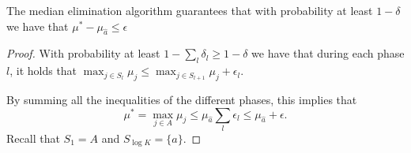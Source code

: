 \begin{theorem}
The median elimination algorithm guarantees that with probability at least $1-\delta$ we have that $\mu^*-\mu_{\hat{a}}\leq \epsilon$
\end{theorem}

\begin{proof}
With probability at least $1- \sum_l \delta_l \geq 1-\delta$ we have that during each phase $l$, it holds that $\max_{j\in
S_{l}}\mu_{j} \leq \max_{j\in S_{l+1}}\mu_{j}+ \epsilon_{l}$.

By summing all the inequalities of the different phases,
this implies that 
\[
\mu^*=\max_{j\in
A} \mu_{j} \leq \mu_{\hat{a}} \sum_l \epsilon_{l}\leq \mu_{\hat{a}} +\epsilon.
\]
Recall that $S_1=A$ and $S_{\log K} =\{\hat{a}\}$.
\end{proof}